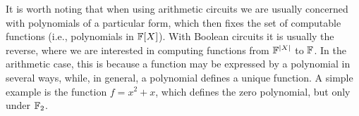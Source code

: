 It is worth noting that when using arithmetic circuits we are usually concerned
with polynomials of a particular form, which then fixes the set of computable
functions (i.e., polynomials in $\mathbb{F}[X]$). With Boolean circuits it is usually
the reverse, where we are interested in computing functions from $\mathbb{F}^{|X|}$
to $\mathbb{F}$.
%
In the arithmetic case, this is because a function may be expressed by
a polynomial in several ways, while, in general, a polynomial defines a unique
function. A simple example is the function $f = x^2 + x$, which defines the
zero polynomial, but only under $\mathbb{F}_2$.



